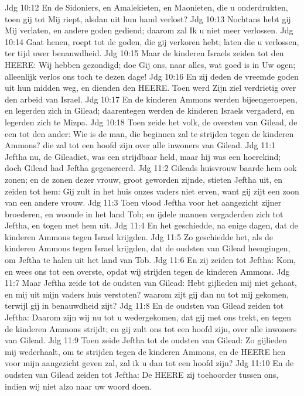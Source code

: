 Jdg 10:12  En de Sidoniers, en Amalekieten, en Maonieten, die u onderdrukten, toen gij tot Mij riept, alsdan uit hun hand verlost?
Jdg 10:13  Nochtans hebt gij Mij verlaten, en andere goden gediend; daarom zal Ik u niet meer verlossen.
Jdg 10:14  Gaat henen, roept tot de goden, die gij verkoren hebt; laten die u verlossen, ter tijd uwer benauwdheid.
Jdg 10:15  Maar de kinderen Israels zeiden tot den HEERE: Wij hebben gezondigd; doe Gij ons, naar alles, wat goed is in Uw ogen; alleenlijk verlos ons toch te dezen dage!
Jdg 10:16  En zij deden de vreemde goden uit hun midden weg, en dienden den HEERE. Toen werd Zijn ziel verdrietig over den arbeid van Israel.
Jdg 10:17  En de kinderen Ammons werden bijeengeroepen, en legerden zich in Gilead; daarentegen werden de kinderen Israels vergaderd, en legerden zich te Mizpa.
Jdg 10:18  Toen zeide het volk, de oversten van Gilead, de een tot den ander: Wie is de man, die beginnen zal te strijden tegen de kinderen Ammons? die zal tot een hoofd zijn over alle inwoners van Gilead.
Jdg 11:1  Jeftha nu, de Gileadiet, was een strijdbaar held, maar hij was een hoerekind; doch Gilead had Jeftha gegenereerd.
Jdg 11:2  Gileads huisvrouw baarde hem ook zonen; en de zonen dezer vrouw, groot geworden zijnde, stieten Jeftha uit, en zeiden tot hem: Gij zult in het huis onzes vaders niet erven, want gij zijt een zoon van een andere vrouw.
Jdg 11:3  Toen vlood Jeftha voor het aangezicht zijner broederen, en woonde in het land Tob; en ijdele mannen vergaderden zich tot Jeftha, en togen met hem uit.
Jdg 11:4  En het geschiedde, na enige dagen, dat de kinderen Ammons tegen Israel krijgden.
Jdg 11:5  Zo geschiedde het, als de kinderen Ammons tegen Israel krijgden, dat de oudsten van Gilead heengingen, om Jeftha te halen uit het land van Tob.
Jdg 11:6  En zij zeiden tot Jeftha: Kom, en wees ons tot een overste, opdat wij strijden tegen de kinderen Ammons.
Jdg 11:7  Maar Jeftha zeide tot de oudsten van Gilead: Hebt gijlieden mij niet gehaat, en mij uit mijn vaders huis verstoten? waarom zijt gij dan nu tot mij gekomen, terwijl gij in benauwdheid zijt?
Jdg 11:8  En de oudsten van Gilead zeiden tot Jeftha: Daarom zijn wij nu tot u wedergekomen, dat gij met ons trekt, en tegen de kinderen Ammons strijdt; en gij zult ons tot een hoofd zijn, over alle inwoners van Gilead.
Jdg 11:9  Toen zeide Jeftha tot de oudsten van Gilead: Zo gijlieden mij wederhaalt, om te strijden tegen de kinderen Ammons, en de HEERE hen voor mijn aangezicht geven zal, zal ik u dan tot een hoofd zijn?
Jdg 11:10  En de oudsten van Gilead zeiden tot Jeftha: De HEERE zij toehoorder tussen ons, indien wij niet alzo naar uw woord doen.
